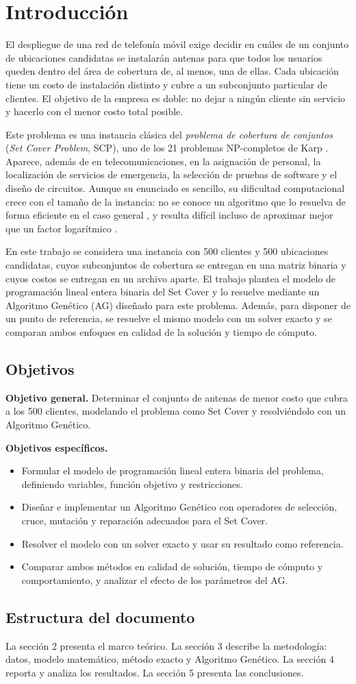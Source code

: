 \section{Introducción}

El despliegue de una red de telefonía móvil exige decidir en cuáles de un conjunto de ubicaciones candidatas se instalarán antenas para que todos los usuarios queden dentro del área de cobertura de, al menos, una de ellas. Cada ubicación tiene un costo de instalación distinto y cubre a un subconjunto particular de clientes. El objetivo de la empresa es doble: no dejar a ningún cliente sin servicio y hacerlo con el menor costo total posible.

Este problema es una instancia clásica del \textit{problema de cobertura de conjuntos} (\textit{Set Cover Problem}, SCP), uno de los 21 problemas NP-completos de Karp \cite{karp72}. Aparece, además de en telecomunicaciones, en la asignación de personal, la localización de servicios de emergencia, la selección de pruebas de software y el diseño de circuitos. Aunque su enunciado es sencillo, su dificultad computacional crece con el tamaño de la instancia: no se conoce un algoritmo que lo resuelva de forma eficiente en el caso general \cite{garey79}, y resulta difícil incluso de aproximar mejor que un factor logarítmico \cite{feige98}.

En este trabajo se considera una instancia con 500 clientes y 500 ubicaciones candidatas, cuyos subconjuntos de cobertura se entregan en una matriz binaria y cuyos costos se entregan en un archivo aparte. El trabajo plantea el modelo de programación lineal entera binaria del Set Cover y lo resuelve mediante un Algoritmo Genético (AG) diseñado para este problema. Además, para disponer de un punto de referencia, se resuelve el mismo modelo con un solver exacto y se comparan ambos enfoques en calidad de la solución y tiempo de cómputo.

\subsection{Objetivos}
\textbf{Objetivo general.} Determinar el conjunto de antenas de menor costo que cubra a los 500 clientes, modelando el problema como Set Cover y resolviéndolo con un Algoritmo Genético.

\textbf{Objetivos específicos.}
\begin{itemize}
\item Formular el modelo de programación lineal entera binaria del problema, definiendo variables, función objetivo y restricciones.
\item Diseñar e implementar un Algoritmo Genético con operadores de selección, cruce, mutación y reparación adecuados para el Set Cover.
\item Resolver el modelo con un solver exacto y usar su resultado como referencia.
\item Comparar ambos métodos en calidad de solución, tiempo de cómputo y comportamiento, y analizar el efecto de los parámetros del AG.
\end{itemize}

\subsection{Estructura del documento}
La sección 2 presenta el marco teórico. La sección 3 describe la metodología: datos, modelo matemático, método exacto y Algoritmo Genético. La sección 4 reporta y analiza los resultados. La sección 5 presenta las conclusiones.
